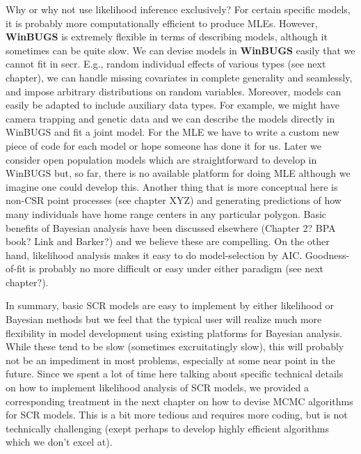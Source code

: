 Why or why not use likelihood inference exclusively? For certain
specific models, it is probably more computationally efficient to
produce MLEs. However, {\bf WinBUGS} is extremely flexible in terms of
describing models, although it sometimes can be quite slow. We can
devise models in {\bf WinBUGS} easily that we cannot fit in secr. E.g.,
random individual effects of various types (see next chapter), we can
handle missing covariates in complete generality and seamlessly, and
impose arbitrary distributions on random variables. Moreover, models
can easily be adapted to include auxiliary data types. For example, we
might have camera trapping and genetic data and we can describe the
models directly in WinBUGS and fit a joint model. For the MLE we have
to write a custom new piece of code for each model or hope someone has
done it for us.  Later we consider open population models which are
straightforward to develop in WinBUGS but, so far, there is no
available platform for doing MLE although we imagine one could develop
this.  Another thing that is more conceptual here is non-CSR point
processes (see chapter XYZ) and generating predictions of how many
individuals have home range centers in any particular polygon.  Basic
benefits of Bayesian analysis have been discussed elsewhere (Chapter
2? BPA book? Link and Barker?) and we believe these are compelling. On
the other hand, likelihood analysis makes it easy to do
model-selection by AIC. Goodness-of-fit is probably no more difficult
or easy under either paradigm (see next chapter?).

In summary, basic SCR models are easy to implement by either
likelihood or Bayesian methods but we feel that the typical user will
realize much more flexibility in model development using existing
platforms for Bayesian analysis. While these tend to be slow
(sometimes excruitatingly slow), this will probably not be an
impediment in most problems, especially at some near point in the
future.  Since we spent a lot of time here talking about specific
technical details on how to implement likelihood analysis of SCR
models, we provided a corresponding treatment in the next chapter on
how to devise MCMC algorithms for SCR models. This is a bit more
tedious and requires more coding, but is not technically challenging
(exept perhaps to develop highly efficient algorithms which we don’t
excel at).



